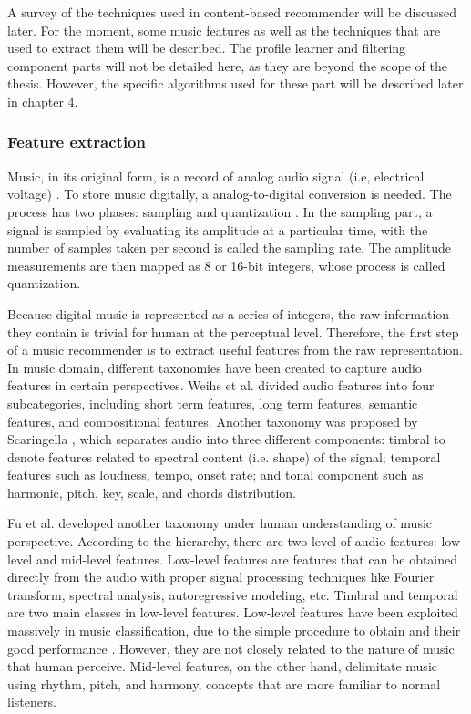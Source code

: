 A survey of the techniques used in content-based recommender will be discussed later. For the moment, some music features as well as the techniques that are used to extract them will be described. The profile learner and filtering component parts will not be detailed here, as they are beyond the scope of the thesis. However, the specific algorithms used for these part will be described later in chapter 4. 


\subsubsection{Feature extraction}
Music, in its original form, is a record of analog audio signal (i.e, electrical voltage) \cite{hodgson2010understanding}. To store music digitally, a analog-to-digital conversion is needed. The process has two phases: sampling and quantization \cite{jurafskyspeech}. In the sampling part, a signal is sampled by evaluating its amplitude at a particular time, with the number of samples taken per second is called the sampling rate. The amplitude measurements are then mapped as 8 or 16-bit integers, whose process is called quantization. 

Because digital music is represented as a series of integers, the raw information they contain is trivial for human at the perceptual level. Therefore, the first step of a music recommender is to extract useful features from the raw representation. In music domain, different taxonomies have been created to capture audio features in certain perspectives. Weihs et al. \cite{weihs2007classification} divided audio features into four subcategories, including short term features, long term features, semantic features, and compositional features. Another taxonomy was proposed by Scaringella \cite{scaringella2006automatic}, which separates audio into three different components: timbral to denote features related to spectral content (i.e. shape) of the signal; temporal features such as loudness, tempo, onset rate; and tonal component such as harmonic, pitch, key, scale, and chords distribution. 

Fu et al. \cite{fu2011survey} developed another taxonomy under human understanding of music perspective. According to the hierarchy, there are two level of audio features: low-level and mid-level features. Low-level features are features that can be obtained directly from the audio with proper signal processing techniques like Fourier transform, spectral analysis, autoregressive modeling, etc. Timbral and temporal are two main classes in low-level features. Low-level features have been exploited massively in music classification, due to the simple procedure to obtain and their good performance . However, they are not closely related to the nature of music that human perceive. Mid-level features, on the other hand, delimitate music using rhythm, pitch, and harmony, concepts that are more familiar to normal listeners. 

